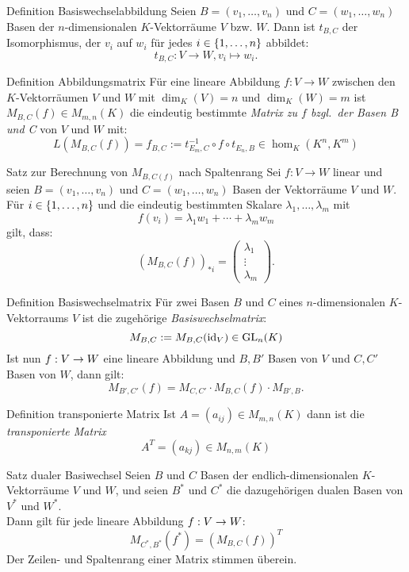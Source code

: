 \documentclass[main.tex]{subfiles}
\begin{document}
\begin{karte}{Definition Basiswechselabbildung}
    Seien \(B = (v_1, \ldots , v_n)\) und \(C = (w_1, \ldots , w_n)\)
    Basen der \(n\)-dimensionalen \(K\)-Vektorräume \(V\) bzw. \(W\).
    Dann ist \(t_{B,C}\) der Isomorphismus, der \(v_i\) auf \(w_i\) für 
    jedes \(i \in \{1, \ldots,n\}\) abbildet: 
    \[ t_{B,C}: V \rightarrow W, v_i \mapsto w_i. \]
\end{karte}
\begin{karte}{Definition Abbildungsmatrix}
    Für eine lineare Abbildung \(f:V \rightarrow W\) zwischen den
    \(K\)-Vektorräumen \(V\) und \(W\) mit \(\dim_K(V) = n\) und 
    \(\dim_K(W) = m\) ist \(M_{B,C}(f) \in M_{m,n}(K)\) die 
    eindeutig bestimmte \textit{Matrix zu \(f\) bzgl.\ der Basen 
    B und C} von \(V\) und \(W\) mit: 
    \[ L(M_{B,C}(f)) = f_{B,C} := t_{E_m,C}^{-1} \circ f \circ t_{E_n,B} 
    \in \hom_K(K^n,K^m)\] 
\end{karte}
\begin{karte}{Satz zur Berechnung von \(M_{B,C(f)}\) nach Spaltenrang}
    Sei \(f: V \rightarrow W\) linear und seien \(B = (v_1, \ldots ,v_n)\)
    und \(C = (w_1, \ldots , w_n)\) Basen der Vektorräume \(V\) und \(W\).
    Für \(i \in \{1,\ldots,n\}\) und die eindeutig bestimmten Skalare
    \(\lambda_1,\ldots,\lambda_m\) mit
    \[f(v_i) = \lambda_1w_1 + \cdots + \lambda_m w_m\]
    gilt, dass: 
    \[{(M_{B,C}(f))}_{*i} = 
    \begin{pmatrix}
        \lambda_1 \\
        \vdots \\
        \lambda_m
    \end{pmatrix}.\]
\end{karte}
\begin{karte}{Definition Basiswechselmatrix}
    Für zwei Basen \(B\) und \(C\) eines \(n\)-dimensionalen 
    \(K\)-Vektorraums \(V\) ist die zugehörige 
    \textit{Basiswechselmatrix}:
    \[M_{B,C} := M_{B,C}(\operatorname{id}_V) \in \operatorname{GL}_n(K) \]
    Ist nun \( f : V \rightarrow W \) eine lineare Abbildung und 
    \(B,B'\) Basen von \(V\) und \(C,C'\) Basen von \(W\), dann gilt:
    \[ M_{B',C'}(f) = M_{C,C'} \cdot M_{B,C}(f) \cdot M_{B',B}. \]
\end{karte}
\begin{karte}{Definition transponierte Matrix}
    Ist \(A = (a_{ij}) \in M_{m,n}(K)\) dann ist die \textit{transponierte Matrix}
    \[ A^T  = (a_{kj}) \in M_{n,m}(K) \]
\end{karte}
\begin{karte}{Satz dualer Basiwechsel}
    Seien \(B\) und \(C\) Basen der endlich-dimensionalen 
    \(K\)-Vektorräume \(V\) und \(W\), und seien \(B^*\) und \(C^*\)
    die dazugehörigen dualen Basen von \(V^*\) und \(W^*\).\\
    Dann gilt für jede lineare Abbildung \( f : V \rightarrow W \):
    \[M_{C^*,B^*}(f^*) = {(M_{B,C}(f))}^T\]
    Der Zeilen- und Spaltenrang einer Matrix stimmen überein.
\end{karte}
\end{document}
